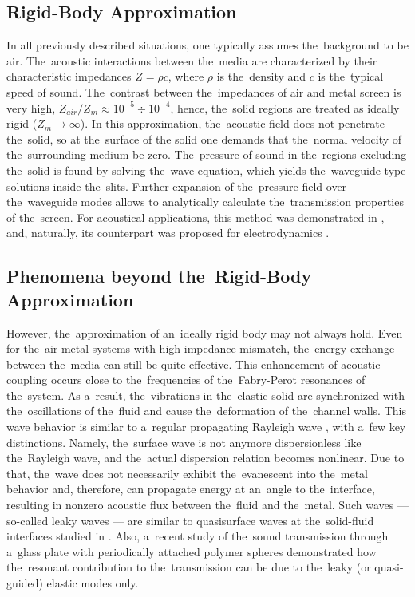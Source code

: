 \subsection{Rigid-Body Approximation}

In all previously described situations, one typically assumes the~background to be air.
The~acoustic interactions between the~media are characterized by their characteristic impedances $Z=\rho c$, where $\rho$ is the~density and $c$ is the~typical speed of sound.
The~contrast between the~impedances of air and metal screen is very high, $Z_{air}/Z_m \approx 10^{-5}\div 10^{-4}$, hence, the~solid regions are treated as ideally rigid ($Z_m\rightarrow\infty$).
In this approximation, the~acoustic field does not penetrate the~solid, so at the~surface of the solid one demands that the~normal velocity of the~surrounding medium be zero.
The~pressure of sound in the~regions excluding the~solid is found by solving the~wave equation, which yields the~waveguide-type solutions inside the~slits.
Further expansion of the~pressure field over the~waveguide modes allows to analytically calculate the~transmission properties of the~screen.
For acoustical applications, this method was demonstrated in \cite{christensen2,christensen3}, and, naturally, its counterpart was proposed for electrodynamics \cite{mcphedran,vidal,sturman}.



\subsection{Phenomena beyond the~Rigid-Body Approximation}

However, the~approximation of an~ideally rigid body may not always hold.
Even for the~air-metal systems with high impedance mismatch, the~energy exchange between the~media can still be quite effective.
This enhancement of acoustic coupling occurs close to the~frequencies of the~Fabry-Perot resonances of the~system.
As a~result, the~vibrations in the~elastic solid are synchronized with the~oscillations of the~fluid and cause the~deformation of the~channel walls.
This wave behavior is similar to a~regular propagating Rayleigh wave \cite{viktor}, with a~few key distinctions.
Namely, the~surface wave is not anymore dispersionless like the~Rayleigh wave, and the~actual dispersion relation becomes nonlinear.
Due to that, the~wave does not necessarily exhibit the~evanescent into the~metal behavior and, therefore, can propagate energy at an~angle to the~interface, resulting in nonzero acoustic flux between the~fluid and the~metal.
Such waves --- so-called leaky waves --- are similar to quasisurface waves at the~solid-fluid interfaces studied in \cite{viktor,maradudin1,ash}.
Also, a~recent study \cite{stefanou} of the~sound transmission through a~glass plate with periodically attached polymer spheres demonstrated how the~resonant contribution to the~transmission can be due to the~leaky (or quasi-guided) elastic modes only.



